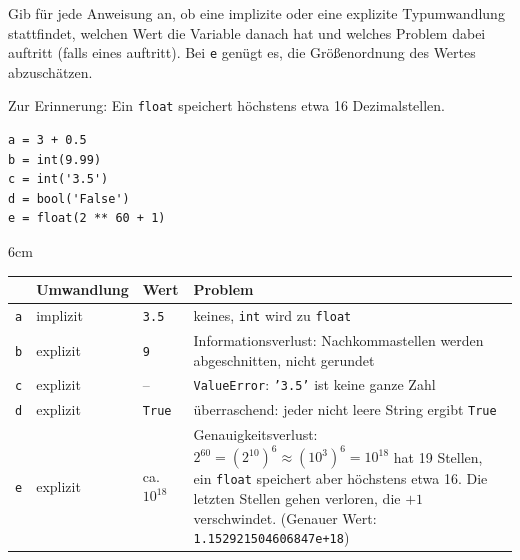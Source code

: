 \question[5]
Gib für jede Anweisung an, ob eine implizite oder eine explizite Typumwandlung stattfindet, welchen Wert die
Variable danach hat und welches Problem dabei auftritt (falls eines auftritt). Bei \texttt{e} genügt es, die
Größenordnung des Wertes abzuschätzen.

Zur Erinnerung: Ein \texttt{float} speichert höchstens etwa 16 Dezimalstellen.

\begin{lstlisting}
a = 3 + 0.5
b = int(9.99)
c = int('3.5')
d = bool('False')
e = float(2 ** 60 + 1)
\end{lstlisting}

\begin{solutionbox}{6cm}
\mbox{}\\
\begin{tabular}[t]{lllp{7.5cm}}
 & Umwandlung & Wert & Problem \\ \hline
\texttt{a} & implizit & \texttt{3.5} & keines, \texttt{int} wird zu \texttt{float} \\
\texttt{b} & explizit & \texttt{9} & Informationsverlust: Nachkommastellen werden abgeschnitten, nicht gerundet \\
\texttt{c} & explizit & -- & \texttt{ValueError}: \texttt{'3.5'} ist keine ganze Zahl \\
\texttt{d} & explizit & \texttt{True} & überraschend: jeder nicht leere String ergibt \texttt{True} \\
\texttt{e} & explizit & ca. $10^{18}$ & Genauigkeitsverlust: $2^{60} = (2^{10})^6 \approx (10^3)^6 = 10^{18}$
hat 19 Stellen, ein \texttt{float} speichert aber höchstens etwa 16. Die letzten Stellen gehen verloren,
die $+1$ verschwindet. (Genauer Wert: \texttt{1.152921504606847e+18}) \\
\end{tabular}
\end{solutionbox}
